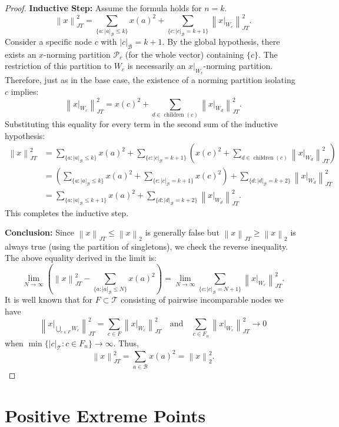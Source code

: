 \documentclass[11pt,a4paper]{amsart}
\newcommand{\JT}{JT}
\newcommand{\Tree}{\mathcal{T}}
\newcommand{\norm}[1]{\left\lVert#1\right\rVert}
\begin{document}
\begin{proof}
    \textbf{Inductive Step:}
    Assume the formula holds for $n = k$.
    \[ \norm{x}_{\JT}^2 = \sum_{\{a : |a|_{\mathcal{B}} \le k\}} x(a)^2 + \sum_{\{c : |c|_{\mathcal{B}} = k+1\}} \norm{x|_{W_c}}_{\JT}^2. \]
    Consider a specific node $c$ with $|c|_{\mathcal{B}} = k+1$. By the global hypothesis, there exists an $x$-norming partition $\mathcal{P}_c$ (for the whole vector) containing $\{c\}$. The restriction of this partition to $W_c$ is necessarily an $x|_{W_c}$-norming partition.
    Therefore, just as in the base case, the existence of a norming partition isolating $c$ implies:
    \[ \norm{x|_{W_c}}_{\JT}^2 = x(c)^2 + \sum_{d \in \operatorname{children}(c)} \norm{x|_{W_d}}_{\JT}^2. \]
    Substituting this equality for every term in the second sum of the inductive hypothesis:
    \begin{align*}
        \norm{x}_{\JT}^2 &= \sum_{\{a : |a|_{\mathcal{B}} \le k\}} x(a)^2 + \sum_{\{c : |c|_{\mathcal{B}} = k+1\}} \left( x(c)^2 + \sum_{d \in \operatorname{children}(c)} \norm{x|_{W_d}}_{\JT}^2 \right) \\
        &= \left( \sum_{\{a : |a|_{\mathcal{B}} \le k\}} x(a)^2 + \sum_{\{c : |c|_{\mathcal{B}} = k+1\}} x(c)^2 \right) + \sum_{\{d : |d|_{\mathcal{B}} = k+2\}} \norm{x|_{W_d}}_{\JT}^2 \\
        &= \sum_{\{a : |a|_{\mathcal{B}} \le k+1\}} x(a)^2 + \sum_{\{d : |d|_{\mathcal{B}} = k+2\}} \norm{x|_{W_d}}_{\JT}^2.
    \end{align*}
    This completes the inductive step.

    \textbf{Conclusion:}
    Since $\norm{x}_{\JT} \le \norm{x}_2$ is generally false but $\norm{x}_{\JT} \ge \norm{x}_2$ is always true (using the partition of singletons), we check the reverse inequality. 
    The above equality derived in the limit is:
    \[ \lim_{N \to \infty} \left( \norm{x}_{\JT}^2 - \sum_{\{a : |a|_{\mathcal{B}} \le N\}} x(a)^2 \right) = \lim_{N \to \infty} \sum_{\{c : |c|_{\mathcal{B}} = N+1\}} \norm{x|_{W_c}}_{\JT}^2. \]
  It is well known that for $F\subset \Tree$ consisting of pairwise incomparable nodes we have 
  \[ \norm{x|_{ \bigcup_{ c\in F} W_c}}_{\JT} ^2 = \sum_{c\in F} \norm{ x|_{W_c}}_{\JT}^2  \quad \text{and} \quad  \sum_{c\in F_n} \norm{ x|_{W_c}}_{\JT}^2 \to 0               \]
  when $ \min \{ |c|_\Tree : c \in F_n\} \to \infty $.
    Thus, \[\norm{x}_{\JT}^2 = \sum_{a \in \mathcal{B}} x(a)^2 = \norm{x}_2^2. \]
\end{proof}

\section{Positive Extreme Points}
\end{document}
